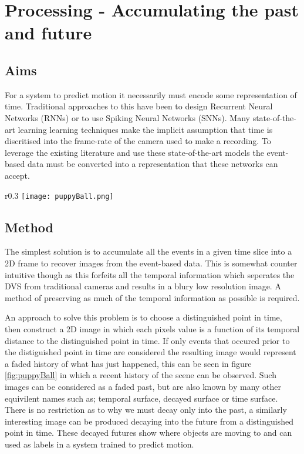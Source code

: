 \chapter{Processing - Accumulating the past and future}
\label{ch:preprocess}

\section{Aims}
For a system to predict motion it necessarily must encode some representation of time. 
Traditional approaches to this have been to design Recurrent Neural Networks (RNNs) or to use Spiking Neural Networks (SNNs). 
Many state-of-the-art learning learning techniques make the implicit assumption that time is discritised into the frame-rate of the camera used to make a recording. 
To leverage the existing literature and use these state-of-the-art models the event-based data must be converted into a representation that these networks can accept. 

\begin{wrapfigure}{r}{0.3\textwidth}
    \centering
    \texttt{[image: puppyBall.png]}
    \caption{A decayed image of a puppy with a ball}
    \label{fig:puppyBall}
\end{wrapfigure}

\section{Method}
The simplest solution is to accumulate all the events in a given time slice into a 2D frame to recover images from the event-based data.
This is somewhat counter intuitive though as this forfeits all the temporal information which seperates the DVS from traditional cameras and results in a blury low resolution image. 
A method of preserving as much of the temporal information as possible is required. 


An approach to solve this problem is to choose a distinguished point in time, then construct a 2D image in which each pixels value is a function of its temporal distance to the distinguished point in time.
If only events that occured prior to the distiguished point in time are considered the resulting image would represent a faded history of what has just happened, this can be seen in figure \ref{fig:puppyBall} in which a recent history of the scene can be observed. 
Such images can be considered as a faded past, but are also known by many other equivilent names such as; temporal surface, decayed surface or time surface. 
There is no restriction as to why we must decay only into the past, a similarly interesting image can be produced decaying into the future from a distinguished point in time.
These decayed futures show where objects are moving to and can used as labels in a system trained to predict motion. 



